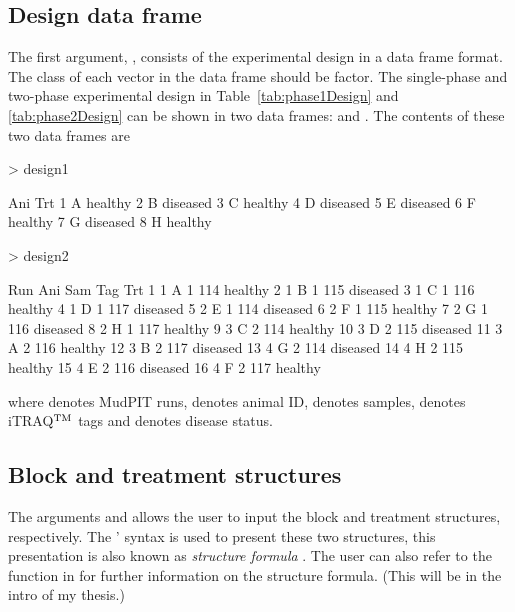 \documentclass[article]{jss}
\begin{document}
\subsection{Design data frame}
The first argument, , consists of the experimental design in a data frame format. The class of each vector in the data frame should be factor. The single-phase and two-phase experimental design in Table~\ref{tab:phase1Design} and \ref{tab:phase2Design} can be shown in two data frames:  and . The contents of these two data frames are
\begin{CodeChunk}
\begin{CodeInput}
> design1
\end{CodeInput}
\begin{CodeOutput}
  Ani      Trt
1   A  healthy
2   B diseased
3   C  healthy
4   D diseased
5   E diseased
6   F  healthy
7   G diseased
8   H  healthy
\end{CodeOutput}

\begin{CodeInput}
> design2
\end{CodeInput}
\begin{CodeOutput}
   Run Ani Sam Tag      Trt
1    1   A   1 114  healthy
2    1   B   1 115 diseased
3    1   C   1 116  healthy
4    1   D   1 117 diseased
5    2   E   1 114 diseased
6    2   F   1 115  healthy
7    2   G   1 116 diseased
8    2   H   1 117  healthy
9    3   C   2 114  healthy
10   3   D   2 115 diseased
11   3   A   2 116  healthy
12   3   B   2 117 diseased
13   4   G   2 114 diseased
14   4   H   2 115  healthy
15   4   E   2 116 diseased
16   4   F   2 117  healthy
\end{CodeOutput}
\end{CodeChunk}
where  denotes MudPIT runs,  denotes animal ID,  denotes samples,  denotes iTRAQ$^{\rm TM}$ tags and  denotes disease status.

\subsection{Block and treatment structures}
The arguments  and  allows the user to input the block and treatment structures, respectively. The \citeauthor{Wilkinson1973}' syntax is used to present these two structures, this presentation is also known as \emph{structure formula} \citep{Wilkinson1973}. The user can also refer to the  function in  for further information on the structure formula. (This will be in the intro of my thesis.) 
 
\end{document}
